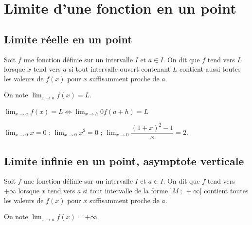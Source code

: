 \documentclass[french]{book}
\newcommand{\ds}{\displaystyle}
\newcommand{\limo}[1][x]{\ds\lim_{#1\rightarrow 0}}
\newcommand{\limite}[2][x]{\ds\lim_{#1\rightarrow #2}}
\begin{document}
\section{Limite d'une fonction en un point}
\subsection{Limite r\'eelle en un point}
\begin{prop}
Soit $f$ une fonction d\'efinie sur un intervalle $I$ et $a\in I$.
On dit que $f$ tend vers $L$ lorsque $x$ tend vers $a$ si tout intervalle ouvert contenant $L$ contient aussi toutes les valeurs de $f(x)$ pour $x$ suffisamment proche de $a$.

On note $\limite[x]{a}f(x)=L$.
\end{prop}

\begin{rem}
$\limite[x]{a}f(x)=L\Leftrightarrow\limite{h}{0}f(a+h)=L$
\end{rem}

\begin{exemple}
$\limo[x]x=0$ ; \hspace{2em} $\limo[x]x^{2}=0$ ; \hspace{2em} $\limo[x]\dfrac{(1+x)^{2}-1}{x}=2$.
\end{exemple}

\subsection{Limite infinie en un point, asymptote verticale}
\begin{prop}
Soit $f$ une fonction d\'efinie sur un intervalle $I$ et $a\in I$.
On dit que $f$ tend vers $+\infty$ lorsque $x$ tend vers $a$ si tout intervalle de la forme $]M~;~+\infty[$ contient toutes les valeurs de $f(x)$ pour $x$ suffisamment proche de $a$.

On note $\limite[x]{a}f(x)=+\infty$.
\end{prop}
\end{document}
